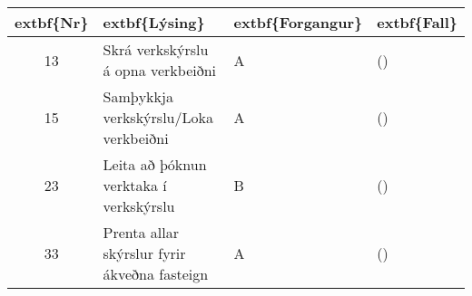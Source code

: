 \documentclass[a4paper]{article}
\begin{document}
\begin{tabular}{|c|p{10cm}|l|l|}
\hline
	extbf\{Nr\}&	extbf\{Lýsing\}&	extbf\{Forgangur\}&	extbf\{Fall\}\\
\hline
13&Skrá verkskýrslu á opna verkbeiðni&A &()\\
\hline
15&Samþykkja verkskýrslu/Loka verkbeiðni&A &()\\
\hline
23&Leita að þóknun verktaka í verkskýrslu&B &()\\
\hline
33&Prenta allar skýrslur fyrir ákveðna fasteign&A &()\\
\hline
\end{tabular}
\end{document}
